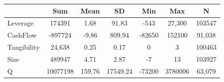 {
\def\sym#1{\ifmmode^{#1}\else\(^{#1}\)\fi}
\begin{tabular}{l*{1}{cccccc}}
\hline\hline
                    &         Sum&        Mean&          SD&         Min&         Max&           N\\
\hline
Leverage            &      174391&        1.68&       91.83&        -543&      27,300&      103547\\
CashFlow            &     -897724&       -9.86&      809.94&      -82650&      152100&      91,038\\
Tangibility         &      24,638&        0.25&        0.17&           0&           3&      100463\\
Size                &      489947&        4.71&        2.87&          -7&          13&      103927\\
Q                   &    10077198&      159.76&    17549.24&      -73200&     3780006&      63,079\\
\hline\hline
\end{tabular}
}
